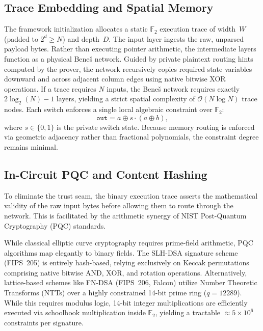 \documentclass[11pt,a4paper]{article}
\begin{document}
\subsection{Trace Embedding and Spatial Memory}

The framework initialization allocates a static $\mathbb{F}_2$
execution trace of width~$W$ (padded to $2^d \ge N$) and depth~$D$.
The input layer ingests the raw, unparsed payload bytes.  Rather
than executing pointer arithmetic, the intermediate layers function
as a physical Bene\v{s} network.  Guided by private plaintext
routing hints computed by the prover, the network recursively copies
required state variables downward and across adjacent column edges
using native bitwise XOR operations.  If a trace requires $N$
inputs, the Bene\v{s} network requires exactly
$2 \log_2(N) - 1$ layers, yielding a strict spatial complexity of
$\mathcal{O}(N \log N)$ trace nodes.  Each switch enforces a single
local algebraic constraint over $\mathbb{F}_2$:
\begin{equation}\label{eq:switch}
  \texttt{out} = a \oplus s \cdot (a \oplus b),
\end{equation}
where $s \in \{0,1\}$ is the private switch state.  Because memory
routing is enforced via geometric adjacency rather than fractional
polynomials, the constraint degree remains minimal.

\subsection{In-Circuit PQC and Content Hashing}

To eliminate the trust seam, the binary execution trace asserts the
mathematical validity of the raw input bytes before allowing them to
route through the network.  This is facilitated by the arithmetic
synergy of NIST Post-Quantum Cryptography (PQC) standards.

While classical elliptic curve cryptography requires prime-field
arithmetic, PQC algorithms map elegantly to binary fields.  The
SLH-DSA signature scheme (FIPS~205) is entirely hash-based, relying
exclusively on Keccak permutations comprising native bitwise AND,
XOR, and rotation operations.  Alternatively, lattice-based schemes
like FN-DSA (FIPS~206, Falcon) utilize Number Theoretic Transforms
(NTTs) over a highly constrained 14-bit prime ring ($q=12289$).
While this requires modulus logic, 14-bit integer multiplications
are efficiently executed via schoolbook multiplication inside
$\mathbb{F}_2$, yielding a tractable $\approx 5 \times 10^6$
constraints per signature.
\end{document}
